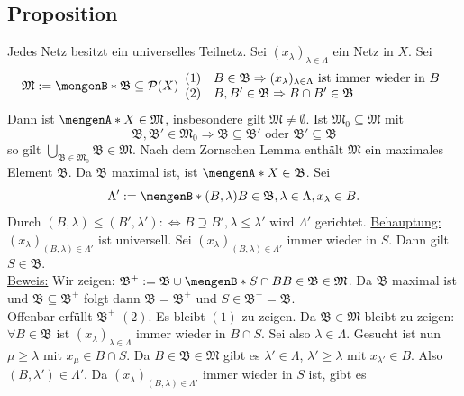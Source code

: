 \subsection[Proposition: Jedes Netzt besitzt universelles Teilnetz]{Proposition} %
\label{sub:412}
Jedes Netz besitzt ein universelles Teilnetz.
Sei $(x_\lambda )_{\lambda  \in \Lambda}$ ein Netz in $X$. Sei 
\[
	\mathfrak{M} := \set[\mathfrak{B} \subseteq \mathcal{P}(X) ]{
	\begin{array}{ll}
		(1) & B \in \mathfrak{B} \Rightarrow (x_\lambda )_{\lambda  \in \Lambda} \text{ ist immer wieder in } B \\
		(2) & B, B' \in \mathfrak{B} \Rightarrow B \cap B' \in \mathfrak{B}
	\end{array}
	} 
\]
Dann ist $\set{X} \in \mathfrak{M}$, insbesondere gilt $\mathfrak{M} \not= \emptyset$. Ist $\mathfrak{M}_0 \subseteq \mathfrak{M}$ mit 
\[
	\mathfrak{B}, \mathfrak{B}' \in \mathfrak{M}_0 \Rightarrow \mathfrak{B} \subseteq \mathfrak{B}' \text{ oder } \mathfrak{B'} \subseteq \mathfrak{B}
\]
so gilt $\bigcup_{\mathfrak{B \in \mathfrak{M}_0}} \mathfrak{B} \in \mathfrak{M}$. Nach dem Zornschen Lemma 
enthält $\mathfrak{M}$ ein maximales Element $\mathfrak{B}$. Da $\mathfrak{B}$ maximal ist, ist $\set{X} \in \mathfrak{B}$. Sei 
\[
	\Lambda' := \set[(B,\lambda )]{B \in \mathfrak{B}, \lambda \in \Lambda, x_\lambda  \in B}. 
\]
Durch $(B,\lambda ) \le (B', \lambda ') :\Leftrightarrow B \supseteq B', \lambda  \le \lambda '$ wird $\Lambda'$ gerichtet.
\uline{Behauptung:} $(x_\lambda )_{(B,\lambda)  \in \Lambda'}$ ist universell.
Sei $(x_\lambda )_{(B,\lambda)  \in \Lambda'}$ immer wieder in $S$. Dann gilt $S \in \mathfrak{B}$. \\
\uline{Beweis:} Wir zeigen: $\mathfrak{B}^+ := \mathfrak{B} \cup \set[S \cap B]{B \in \mathfrak{B}}  \in \mathfrak{M}$. Da $\mathfrak{B}$ maximal ist und 
$\mathfrak{B} \subseteq \mathfrak{B}^+$ folgt dann $\mathfrak{B} = \mathfrak{B}^+$ und $S \in \mathfrak{B}^+ =\mathfrak{B}$. \smallskip \\
Offenbar erfüllt $\mathfrak{B}^+$ $(2)$. Es bleibt $(1)$ zu zeigen.
Da $\mathfrak{B} \in \mathfrak{M}$ bleibt zu zeigen: $\forall B \in \mathfrak{B}$ ist $(x_\lambda )_{\lambda \in \Lambda}$ immer wieder in $B \cap S$. Sei also
$\lambda \in \Lambda$. Gesucht ist nun $\mu \ge \lambda $ mit $x_\mu \in B \cap S$. Da $B \in \mathfrak{B} \in \mathfrak{M}$ gibt es $\lambda ' \in \Lambda$, 
$\lambda ' \ge \lambda $ mit $x_{\lambda'} \in B$. Also $(B, \lambda') \in \Lambda'$. Da $(x_\lambda )_{(B,\lambda)  \in \Lambda'}$ immer wieder in $S$ ist, gibt es
